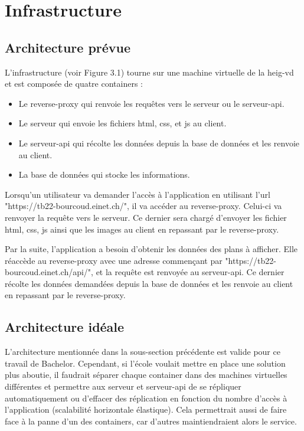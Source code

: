 \documentclass[
    iai, %
    il, %
]{heig-tb}
\begin{document}
\section{Infrastructure}

\subsection{Architecture prévue}

L'infrastructure (voir Figure 3.1) tourne sur une machine virtuelle de la \gls{heig-vd} et est composée de quatre containers :


\begin{itemize}
    \item Le reverse-proxy qui renvoie les requêtes vers le serveur ou le serveur-api.
    \item Le serveur qui envoie les fichiers \gls{html}, \gls{css}, et \gls{js} au client.
    \item Le serveur-api qui récolte les données depuis la base de données et les renvoie au client.
    \item La base de données qui stocke les informations.
\end{itemize}

Lorsqu'un utilisateur va demander l'accès à l'application en utilisant l'url "https://tb22-bourcoud.einet.ch/", il va accéder au reverse-proxy.
Celui-ci va renvoyer la requête vers le serveur.
Ce dernier sera chargé d'envoyer les fichier \gls{html}, \gls{css}, \gls{js} ainsi que les images au client en repassant par le reverse-proxy.

Par la suite, l'application a besoin d'obtenir les données des plans à afficher. Elle réaccède au reverse-proxy avec une adresse commençant par "https://tb22-bourcoud.einet.ch/api/",
et la requête est renvoyée au serveur-api. Ce dernier récolte les données demandées depuis la base de données et les renvoie au client en repassant par le reverse-proxy.

\subsection{Architecture idéale}
L'architecture mentionnée dans la sous-section précédente est valide pour ce travail de Bachelor.
Cependant, si l'école voulait mettre en place une solution plus aboutie,
il faudrait séparer chaque container dans des machines virtuelles différentes
et permettre aux serveur et serveur-api de se répliquer automatiquement
ou d'effacer des réplication en fonction du nombre d'accès à l'application (scalabilité horizontale élastique).
Cela permettrait aussi de faire face à la panne d'un des containers, car d'autres maintiendraient alors le service.
\end{document}
